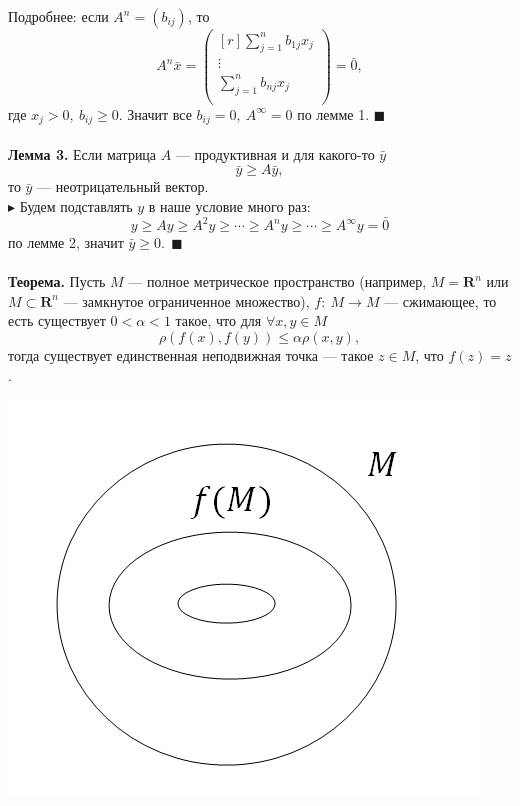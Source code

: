 \documentclass[12pt]{article}
\theoremstyle{definition}
\numberwithin{equation}{section}
\begin{document}
	Подробнее: если $A^n=(b_{ij})$, то 
	\[A^n \bar x = \begin{pmatrix}[r]
	\sum\limits_{j=1}^n b_{1j}x_j\\
	\vdots\\
	\sum\limits_{j=1}^n b_{nj}x_j\\
	\end{pmatrix}=\bar 0,\]
	где $x_j>0,~ b_{ij}\geqslant 0$. Значит все $b_{ij}=0,~A^{\infty}=0$ по лемме 1.   $\blacksquare$\\
	\\
	\textbf{Лемма 3.} Если матрица $A$ --- продуктивная и для какого-то $\bar y$
	$$\bar y \geqslant A\bar y,$$ то $\bar y$ --- неотрицательный вектор.\\
	$\blacktriangleright$ Будем подставлять $y$ в наше условие много раз: $$y\geqslant Ay \geqslant A^2y \geqslant \cdots \geqslant A^n y \geqslant \cdots \geqslant A^{\infty} y =\bar 0$$ по лемме 2, значит $\bar y \geqslant 0.~~\blacksquare$\\
	\\
	\textbf{Теорема.} Пусть $M$ --- полное метрическое пространство (например, $M=\textbf{R}^n$ или $M \subset \textbf{R}^n$ --- замкнутое ограниченное множество), $f:~M\to M$ --- сжимающее, то есть существует $0<\alpha <1$ такое, что для $\forall x, y \in M$
	$$\rho(f(x), f(y))\leqslant \alpha \rho(x, y),$$
	тогда существует единственная неподвижная точка --- такое $z\in M$, что $f(z)=z$.\\
	\begin{center}
		\includegraphics[scale=0.7]{l14_1.png}\\
	\end{center}
\end{document}
